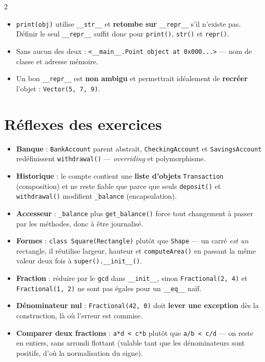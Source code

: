 \documentclass[a4paper,10pt]{article}
\newcommand{\co}[1]{\texttt{\textcolor{codefg}{#1}}}
\begin{document}
\begin{multicols}{2}
\begin{itemize}
  \item \co{print(obj)} utilise \co{\_\_str\_\_} et \textbf{retombe sur}
        \co{\_\_repr\_\_} s'il n'existe pas. Définir le seul
        \co{\_\_repr\_\_} suffit donc pour \co{print()}, \co{str()} et
        \co{repr()}.
  \item Sans aucun des deux :
        \co{<\_\_main\_\_.Point object at 0x000...>} --- nom de classe et
        adresse mémoire.
  \item Un bon \co{\_\_repr\_\_} est \textbf{non ambigu} et permettrait
        idéalement de \textbf{recréer} l'objet : \co{Vector(5, 7, 9)}.
\end{itemize}

\section{Réflexes des exercices}

\begin{itemize}
  \item \textbf{Banque} : \co{BankAccount} parent abstrait,
        \co{CheckingAccount} et \co{SavingsAccount} redéfinissent
        \co{withdrawal()} --- \emph{overriding} et polymorphisme.
  \item \textbf{Historique} : le compte contient une \textbf{liste d'objets}
        \co{Transaction} (composition) et ne reste fiable que parce que
        seuls \co{deposit()} et \co{withdrawal()} modifient \co{\_balance}
        (encapsulation).
  \item \textbf{Accesseur} : \co{\_balance} plus \co{get\_balance()} force
        tout changement à passer par les méthodes, donc à être journalisé.
  \item \textbf{Formes} : \co{class Square(Rectangle)} plutôt que
        \co{Shape} --- un carré \emph{est un} rectangle, il réutilise
        largeur, hauteur et \co{computeArea()} en passant la même valeur
        deux fois à \co{super().\_\_init\_\_()}.
  \item \textbf{Fraction} : réduire par le \co{gcd} dans \co{\_\_init\_\_},
        sinon \co{Fractional(2, 4)} et \co{Fractional(1, 2)} ne sont pas
        égales pour un \co{\_\_eq\_\_} naïf.
  \item \textbf{Dénominateur nul} : \co{Fractional(42, 0)} doit
        \textbf{lever une exception} dès la construction, là où l'erreur est
        commise.
  \item \textbf{Comparer deux fractions} : \co{a*d < c*b} plutôt que
        \co{a/b < c/d} --- on reste en entiers, sans arrondi flottant
        (valable tant que les dénominateurs sont positifs, d'où la
        normalisation du signe).
\end{itemize}

\end{multicols}
\end{document}
